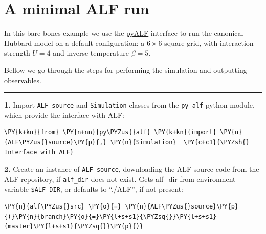     
    

    
    \hypertarget{a-minimal-alf-run}{%
\section{A minimal ALF run}\label{a-minimal-alf-run}}

    In this bare-bones example we use the
\href{https://git.physik.uni-wuerzburg.de/ALF/pyALF/-/tree/master/}{pyALF}
interface to run the canonical Hubbard model on a default configuration:
a \(6\times6\) square grid, with interaction strength \(U=4\) and
inverse temperature \(\beta = 5\).

Bellow we go through the steps for performing the simulation and
outputting observables.

\begin{center}\rule{0.5\linewidth}{0.5pt}\end{center}

\textbf{1.} Import \texttt{ALF\_source} and \texttt{Simulation} classes
from the \texttt{py\_alf} python module, which provide the interface
with ALF:

    \begin{tcolorbox}[breakable, size=fbox, boxrule=1pt, pad at break*=1mm,colback=cellbackground, colframe=cellborder]
\begin{Verbatim}[commandchars=\\\{\}]
\PY{k+kn}{from} \PY{n+nn}{py\PYZus{}alf} \PY{k+kn}{import} \PY{n}{ALF\PYZus{}source}\PY{p}{,} \PY{n}{Simulation}  \PY{c+c1}{\PYZsh{} Interface with ALF}
\end{Verbatim}
\end{tcolorbox}

    \textbf{2.} Create an instance of \texttt{ALF\_source}, downloading the
ALF source code from the
\href{https://git.physik.uni-wuerzburg.de/ALF/ALF/-/tree/master/}{ALF
repository}, if \texttt{alf\_dir} does not exist. Gets alf\_dir from
environment variable \texttt{\$ALF\_DIR}, or defaults to ``./ALF'', if
not present:

    \begin{tcolorbox}[breakable, size=fbox, boxrule=1pt, pad at break*=1mm,colback=cellbackground, colframe=cellborder]
\begin{Verbatim}[commandchars=\\\{\}]
\PY{n}{alf\PYZus{}src} \PY{o}{=} \PY{n}{ALF\PYZus{}source}\PY{p}{(}\PY{n}{branch}\PY{o}{=}\PY{l+s+s1}{\PYZsq{}}\PY{l+s+s1}{master}\PY{l+s+s1}{\PYZsq{}}\PY{p}{)}
\end{Verbatim}
\end{tcolorbox}

